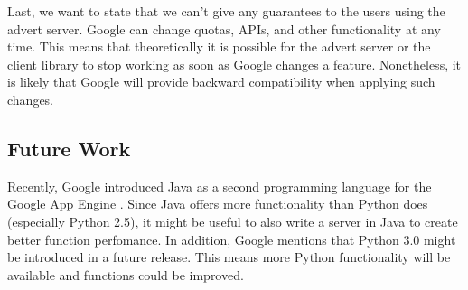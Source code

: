 Last, we want to state that we can't give any guarantees to the users using the
advert server. Google can change quotas, APIs, and other functionality at any
time. This means that theoretically it is possible for the advert server or the
client library to stop working as soon as Google changes a feature.
Nonetheless, it is likely that Google will provide backward compatibility when
applying such changes.

\subsection{Future Work}
\label{conclusion-future}
Recently, Google introduced Java as a second programming language for the
Google App Engine \cite{app-engine-java}. Since Java offers more functionality
than Python does (especially Python 2.5), it might be useful to also write a
server in Java to create better function perfomance. In addition, Google
mentions that Python 3.0 might be introduced in a future release. This means
more Python functionality will be available and functions could be improved.
